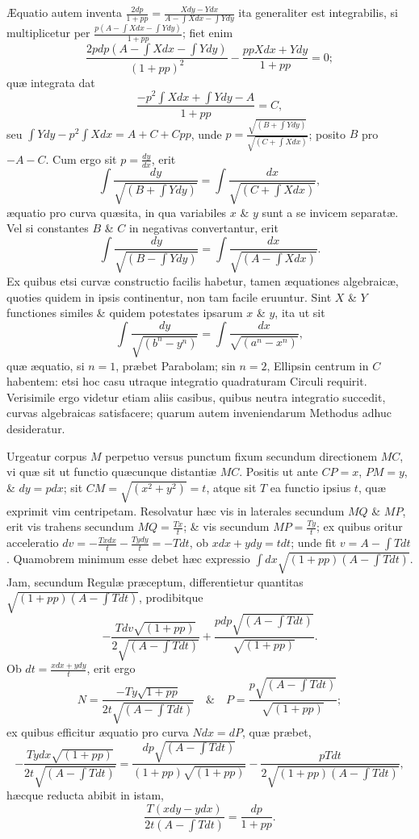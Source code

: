 Æquatio autem inventa $\frac{2dp}{1+pp}=\frac{Xdy-Ydx}{A-\int Xdx-\int Ydy}$ ita generaliter est integrabilis, si multiplicetur per $\frac{p(A-\int Xdx-\int Ydy)}{1+pp}$; fiet enim
\[\frac{2pdp(A-\int Xdx-\int Ydy)}{(1+pp)^2}-\frac{ppXdx+Ydy}{1+pp}=0;\]
quæ integrata dat
\[\frac{-p^2\int Xdx+\int Ydy-A}{1+pp}=C,\]
seu $\int Ydy-p^2\int Xdx=A+C+Cpp$, unde $p=\frac{\sqrt{(B+\int Ydy)}}{\sqrt{(C+\int Xdx)}}$; posito $B$ pro $-A-C$. Cum ergo sit $p=\frac{dy}{dx}$, erit
\[\int\frac{dy}{\sqrt{(B+\int Ydy)}}=\int\frac{dx}{\sqrt{(C+\int Xdx)}},\]
æquatio pro curva quæsita, in qua variabiles $x$ \& $y$ sunt a se invicem separatæ. Vel si constantes $B$ \& $C$ in negativas convertantur, erit
\[\int\frac{dy}{\sqrt{(B-\int Ydy)}}=\int\frac{dx}{\sqrt{(A-\int Xdx)}}.\]
Ex quibus etsi curvæ constructio facilis habetur, tamen æquationes algebraicæ, quoties quidem in ipsis continentur, non tam facile eruuntur. Sint $X$ \& $Y$ functiones similes \& quidem potestates ipsarum $x$ \& $y$, ita ut sit
\[\int\frac{dy}{\sqrt{(b^n-y^n)}}=\int\frac{dx}{\sqrt{(a^n-x^n)}},\]
quæ æquatio, si $n=1$, præbet Parabolam; sin $n=2$, Ellipsin centrum in $C$ habentem: etsi hoc casu utraque integratio quadraturam Circuli requirit. Verisimile ergo videtur etiam aliis casibus, quibus neutra integratio succedit, curvas algebraicas satisfacere; quarum autem inveniendarum Methodus adhuc desideratur.

Urgeatur corpus $M$ perpetuo versus punctum fixum secundum directionem $MC$, vi quæ sit ut functio quæcunque distantiæ $MC$. Positis ut ante $CP=x$, $PM=y$, \& $dy=pdx$; sit $CM=\sqrt{(x^2+y^2)}=t$, atque sit $T$ ea functio ipsius $t$, quæ exprimit vim centripetam. Resolvatur hæc vis in laterales secundum $MQ$ \& $MP$, erit vis trahens secundum $MQ=\frac{Tx}{t}$; \& vis secundum $MP=\frac{Ty}{t}$; ex quibus oritur acceleratio $dv=-\frac{Txdx}{t}-\frac{Tydy}{t}=-Tdt$, ob $xdx+ydy=tdt$; unde fit $v=A-\int Tdt$. Quamobrem minimum esse debet hæc expressio $\int dx\sqrt{(1+pp)(A-\int Tdt)}$. Jam, secundum Regulæ præceptum, differentietur quantitas $\sqrt{(1+pp)(A-\int Tdt)}$, prodibitque
\[-\frac{Tdv\sqrt{(1+pp)}}{2\sqrt{(A-\int Tdt)}}+\frac{pdp\sqrt{(A-\int Tdt)}}{\sqrt{(1+pp)}}.\]
Ob $dt=\frac{xdx+ydy}{t}$, erit ergo
\[N=\frac{-Ty\sqrt{1+pp}}{2t\sqrt{(A-\int Tdt)}}\quad\&\quad P=\frac{p\sqrt{(A-\int Tdt)}}{\sqrt{(1+pp)}};\]
ex quibus efficitur æquatio pro curva $Ndx=dP$, quæ præbet,
\[-\frac{Tydx\sqrt{(1+pp)}}{2t\sqrt{(A-\int Tdt)}}=\frac{dp\sqrt{(A-\int Tdt)}}{(1+pp)\sqrt{(1+pp)}}-\frac{pTdt}{2\sqrt{(1+pp)(A-\int Tdt)}},\]
hæcque reducta abibit in istam,
\[\frac{T(xdy-ydx)}{2t(A-\int Tdt)}=\frac{dp}{1+pp}.\]

